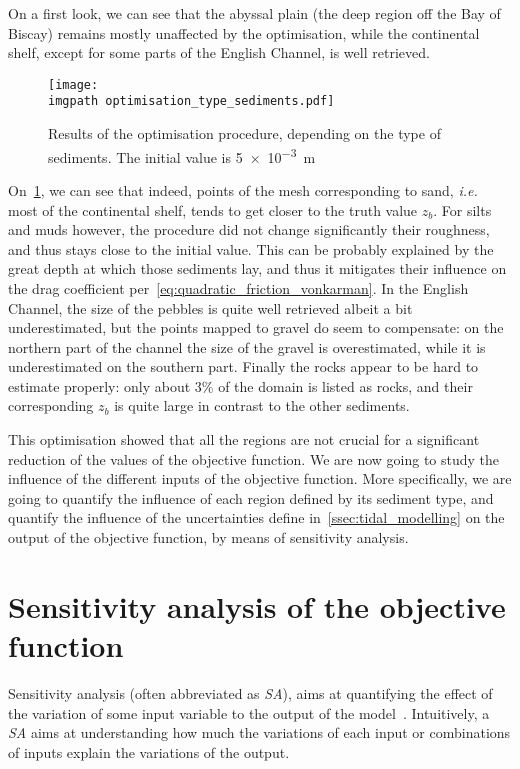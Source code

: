 \documentclass[../../Main_ManuscritThese.tex]{subfiles}
\newcommand{\zob}{z_b}
\newcommand\imgpath{/home/victor/acadwriting/Manuscrit/Text/Chapter5/img/}
\begin{document}
On a first look, we can see that the abyssal plain (the deep region
off the Bay of Biscay) remains mostly unaffected by the optimisation,
while the continental shelf, except for some parts of the English
Channel, is well retrieved.

\begin{figure}[ht]
  \centering
  \texttt{[image: \\imgpath optimisation\_type\_sediments.pdf]}
  \caption[Final values of the optimisation procedure, based on the sediment type]{\label{fig:optimisation_type_sediments} Results of the
    optimisation procedure, depending on the type of sediments. The
    initial value is \SI{5e-3}{\meter}}
\end{figure}

On~\cref{fig:optimisation_type_sediments}, we can see that indeed,
points of the mesh corresponding to sand, \emph{i.e.} most of the
continental shelf, tends to get closer to the truth value $\zob$.  For
silts and muds however, the procedure did not change significantly
their roughness, and thus stays close to the initial value. This can
be probably explained by the great depth at which those sediments lay,
and thus it mitigates their influence on the drag coefficient
per~\cref{eq:quadratic_friction_vonkarman}. In the English Channel,
the size of the pebbles is quite well retrieved albeit a bit
underestimated, but the points mapped to gravel do seem to compensate:
on the northern part of the channel the size of the gravel is
overestimated, while it is underestimated on the southern part.
Finally the rocks appear to be hard to estimate properly: only about
3\% of the domain is listed as rocks, and their corresponding $\zob$
is quite large in contrast to the other sediments.

This optimisation showed that all the regions are not crucial for a
significant reduction of the values of the objective function.
We are now going to study the influence of the different inputs of the
objective function. More specifically, we are going to quantify the
influence of each region defined by its sediment type, and quantify
the influence of the uncertainties define
in~\cref{ssec:tidal_modelling} on the output of the objective
function, by means of sensitivity analysis.


\section{Sensitivity analysis of the objective function}
\label{sec:sensitivity-analysis}
Sensitivity analysis (often abbreviated as \emph{SA}), aims at
quantifying the effect of the variation of some input variable to the
output of the model~\cite{iooss_revue_2011,janon_analyse_2012}.
Intuitively, a \emph{SA} aims at understanding how much the variations
of each input or combinations of inputs explain the variations of the
output.
\end{document}
